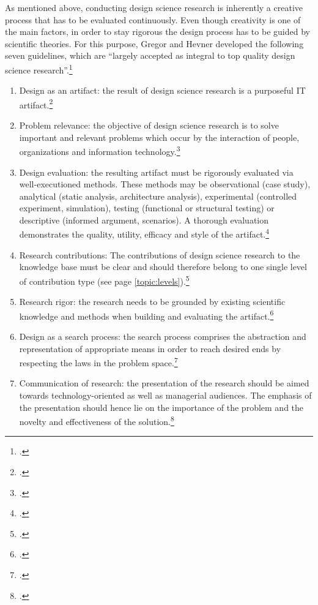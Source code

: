 As mentioned above, conducting design science research is inherently a creative process that has to be evaluated continuously. Even though creativity is one of the main factors, in order to stay rigorous the design process has to be guided by scientific theories. For this purpose, Gregor and Hevner developed the following seven guidelines, which are \enquote{largely accepted as integral to top quality design science research}.\footcite[p.19]{HevnerDesignResearchInformation2010} 
\begin{enumerate}
    \item Design as an artifact: the result of design science research is a purposeful IT artifact.\footcites[Cf.][p.82]{HevnerDesignScienceResearch2004}[cf.][p.viii]{WeberEditorCommentsStill2003}
    \item Problem relevance: the objective of design science research is to solve important and relevant problems which occur by the interaction of people, organizations and information technology.\footcite[Cf.][pp.82,83]{HevnerDesignScienceResearch2004}
    \item Design evaluation: the resulting artifact must be rigorously evaluated via well-executioned methods. These methods may be observational (case study), analytical (static analysis, architecture analysis), experimental (controlled experiment, simulation), testing (functional or structural testing) or descriptive (informed argument, scenarios). A thorough evaluation demonstrates the quality, utility, efficacy and style of the artifact.\footcite[Cf.][pp.83-86]{HevnerDesignScienceResearch2004}
    \item Research contributions: The contributions of design science research to the knowledge base must be clear and should therefore belong to one single level of contribution type (see page \ref{topic:levels}).\footcite[Cf.][pp.83,87]{HevnerDesignScienceResearch2004}
    \item Research rigor: the research needs to be grounded by existing scientific knowledge and methods when building and evaluating the artifact.\footcite[Cf.][p.83]{HevnerDesignScienceResearch2004}
    \item Design as a search process: the search process comprises the abstraction and representation of appropriate means in order to reach desired ends by respecting the laws in the problem space.\footcite[Cf.][pp.83,88-89]{HevnerDesignScienceResearch2004}
    \item Communication of research: the presentation of the research should be aimed towards technology-oriented as well as managerial audiences. The emphasis of the presentation should hence lie on the importance of the problem and the novelty and effectiveness of the solution.\footcites[Cf.][p.iv]{ZmudEditorComments1997}[cf.][pp.83,90]{HevnerDesignScienceResearch2004}
\end{enumerate}

